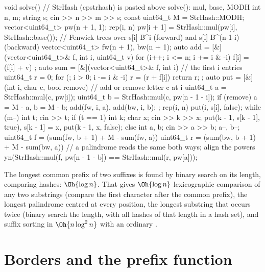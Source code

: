 \begin{code}
void solve() {  // StrHash (cpstrhash) is pasted above solve(): mul, base, MODH
    int n, m;
    string s;
    cin >> n >> m >> s;
    const uint64_t M = StrHash::MODH;
    vector<uint64_t> pw(n + 1, 1);
    rep(i, n) pw[i + 1] = StrHash::mul(pw[i], StrHash::base());
    // Fenwick trees over s[i] B^i (forward) and s[i] B^(n-1-i) (backward)
    vector<uint64_t> fw(n + 1), bw(n + 1);
    auto add = [&](vector<uint64_t>& f, int i, uint64_t v) {
        for (i++; i <= n; i += i & -i) f[i] = (f[i] + v) %
    };
    auto sum = [&](vector<uint64_t>& f, int i) {  // the first i entries
        uint64_t r = 0;
        for (; i > 0; i -= i & -i) r = (r + f[i]) %
        return r;
    };
    auto put = [&](int i, char c, bool remove) {  // add or remove letter c at i
        uint64_t a = StrHash::mul(c, pw[i]);
        uint64_t b = StrHash::mul(c, pw[n - 1 - i]);
        if (remove) a = M - a, b = M - b;
        add(fw, i, a), add(bw, i, b);
    };
    rep(i, n) put(i, s[i], false);
    while (m--) {
        int t;
        cin >> t;
        if (t == 1) {
            int k;
            char x;
            cin >> k >> x;
            put(k - 1, s[k - 1], true), s[k - 1] = x, put(k - 1, x, false);
        } else {
            int a, b;
            cin >> a >> b;
            a--, b--;
            uint64_t f = (sum(fw, b + 1) + M - sum(fw, a)) %
            uint64_t r = (sum(bw, b + 1) + M - sum(bw, a)) %
            // a palindrome reads the same both ways; align the powers
            yn(StrHash::mul(f, pw[n - 1 - b]) == StrHash::mul(r, pw[a]));
        }
    }
}
\end{code}

\begin{trick}
The longest common prefix of two suffixes is found by binary search on its length, comparing hashes: $\Oh{\log n}$. That gives
$\Oh{\log n}$ lexicographic comparison of any two substrings (compare the first character after the common prefix), the longest
palindrome centred at every position, the longest substring that occurs twice (binary search the length, with all hashes of that length
in a hash set), and suffix sorting in $\Oh{n \log^2 n}$ with an ordinary .
\end{trick}

\section[Borders and the prefix function]{Borders and the prefix function \hfill \plat}\label{sec:kmp}

